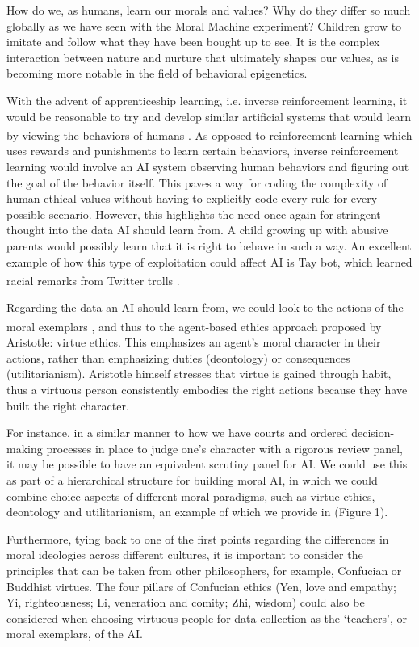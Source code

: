 \documentclass[10pt]{article}
\begin{document}
How do we, as humans, learn our morals and values? Why do they differ so much globally as we have seen with the Moral Machine experiment? Children grow to imitate and follow what they have been bought up to see. It is the complex interaction between nature and nurture that ultimately shapes our values, as is becoming more notable in the field of behavioral epigenetics.

With the advent of apprenticeship learning, i.e. inverse reinforcement learning, it would be reasonable to try and develop similar artificial systems that would learn by viewing the behaviors of humans \textsuperscript{\cite{abel_reinforcement_2016}}. As opposed to reinforcement learning which uses rewards and punishments to learn certain behaviors, inverse reinforcement learning would involve an AI system observing human behaviors and figuring out the goal of the behavior itself. This paves a way for coding the complexity of human ethical values without having to explicitly code every rule for every possible scenario. However, this highlights the need once again for stringent thought into the data AI should learn from. A child growing up with abusive parents would possibly learn that it is right to behave in such a way. An excellent example of how this type of exploitation could affect AI is Tay bot, which learned racial remarks from Twitter trolls \textsuperscript{\cite{neff_talking_2016}}.

Regarding the data an AI should learn from, we could look to the actions of the moral exemplars \textsuperscript{\cite{hindocha_moral_2022}}, and thus to the agent-based ethics approach proposed by Aristotle: virtue ethics. This emphasizes an agent’s moral character in their actions, rather than emphasizing duties (deontology) or consequences (utilitarianism). Aristotle himself stresses that virtue is gained through habit, thus a virtuous person consistently embodies the right actions because they have built the right character. 

For instance, in a similar manner to how we have courts and ordered decision-making processes in place to judge one’s character with a rigorous review panel, it may be possible to have an equivalent scrutiny panel for AI. We could use this as part of a hierarchical structure for building moral AI, in which we could combine choice aspects of different moral paradigms, such as virtue ethics, deontology and utilitarianism, an example of which we provide in (Figure 1). 

Furthermore, tying back to one of the first points regarding the differences in moral ideologies across different cultures, it is important to consider the principles that can be taken from other philosophers, for example, Confucian or Buddhist virtues. The four pillars of Confucian ethics (Yen, love and empathy; Yi, righteousness; Li, veneration and comity; Zhi, wisdom) could also be considered when choosing virtuous people for data collection as the ‘teachers’, or moral exemplars, of the AI.
\end{document}
